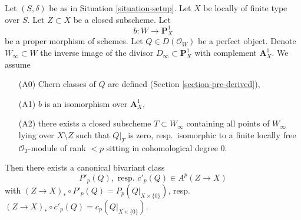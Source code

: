\begin{lemma}
\label{lemma-localized-chern-pre}
Let $(S, \delta)$ be as in Situation \ref{situation-setup}. Let $X$ be
locally of finite type over $S$. Let $Z \subset X$ be a closed subscheme.
Let
$$
b : W \longrightarrow \mathbf{P}^1_X
$$
be a proper morphism of schemes. Let $Q \in D(\mathcal{O}_W)$ be a
perfect object. Denote $W_\infty \subset W$ the inverse image of the divisor
$D_\infty \subset \mathbf{P}^1_X$ with complement $\mathbf{A}^1_X$.
We assume
\begin{enumerate}
\item[(A0)] Chern classes of $Q$ are defined
(Section \ref{section-pre-derived}),
\item[(A1)] $b$ is an isomorphism over $\mathbf{A}^1_X$,
\item[(A2)] there exists a closed subscheme $T \subset W_\infty$
containing all points of $W_\infty$ lying over $X \setminus Z$ such that
$Q|_T$ is zero, resp.\ isomorphic to a finite locally free
$\mathcal{O}_T$-module of rank $< p$ sitting in cohomological degree $0$.
\end{enumerate}
Then there exists a canonical bivariant class
$$
P'_p(Q),\text{ resp. }c'_p(Q) \in A^p(Z \to X)
$$
with
$(Z \to X)_* \circ P'_p(Q) = P_p(Q|_{X \times \{0\}})$,
resp.\ $(Z \to X)_* \circ c'_p(Q) = c_p(Q|_{X \times \{0\}})$.
\end{lemma}

